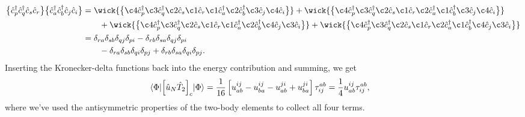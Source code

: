         \begin{align}
            \normalord{
                \ccr{p}
                \ccr{q}
                \can{s}
                \can{r}
            }
            \normalord{
                \ccr{a}
                \ccr{b}
                \can{j}
                \can{i}
            }
            &=
            \wick{
                \normalord{
                    \c4 {\ccr{p}}
                    \c3 {\ccr{q}}
                    \c2 {\can{s}}
                    \c1 {\can{r}}
                    \c1 {\ccr{a}}
                    \c2 {\ccr{b}}
                    \c3 {\can{j}}
                    \c4 {\can{i}}
                }
            }
            +
            \wick{
                \normalord{
                    \c4 {\ccr{p}}
                    \c3 {\ccr{q}}
                    \c2 {\can{s}}
                    \c1 {\can{r}}
                    \c2 {\ccr{a}}
                    \c1 {\ccr{b}}
                    \c3 {\can{j}}
                    \c4 {\can{i}}
                }
            }
            \nonumber \\
            &\qquad
            +
            \wick{
                \normalord{
                    \c4 {\ccr{p}}
                    \c3 {\ccr{q}}
                    \c2 {\can{s}}
                    \c1 {\can{r}}
                    \c1 {\ccr{a}}
                    \c2 {\ccr{b}}
                    \c4 {\can{j}}
                    \c3 {\can{i}}
                }
            }
            +
            \wick{
                \normalord{
                    \c4 {\ccr{p}}
                    \c3 {\ccr{q}}
                    \c2 {\can{s}}
                    \c1 {\can{r}}
                    \c2 {\ccr{a}}
                    \c1 {\ccr{b}}
                    \c4 {\can{j}}
                    \c3 {\can{i}}
                }
            }
            \\
            &=
            \delta_{ra}
            \delta_{sb}
            \delta_{qj}
            \delta_{pi}
            -
            \delta_{rb}
            \delta_{sa}
            \delta_{qj}
            \delta_{pi}
            \nonumber \\
            &\qquad
            -
            \delta_{ra}
            \delta_{sb}
            \delta_{qi}
            \delta_{pj}
            +
            \delta_{rb}
            \delta_{sa}
            \delta_{qi}
            \delta_{pj}.
        \end{align}
        Inserting the Kronecker-delta functions back into the energy
        contribution and summing, we get
        \begin{align}
            \mel{\Phi}{
                \left[ 
                    \hat{u}_N \hat{T}_2
                 \right]_c
            }{\Phi}
            &=
            \frac{1}{16}\left[ 
                u^{ij}_{ab}
                - u^{ij}_{ba}
                - u^{ji}_{ab}
                + u^{ji}_{ba}
             \right]\tau^{ab}_{ij}
            =
            \frac{1}{4}u^{ij}_{ab}\tau^{ab}_{ij},
        \end{align}
        where we've used the antisymmetric properties of the two-body
        elements to collect all four terms.

